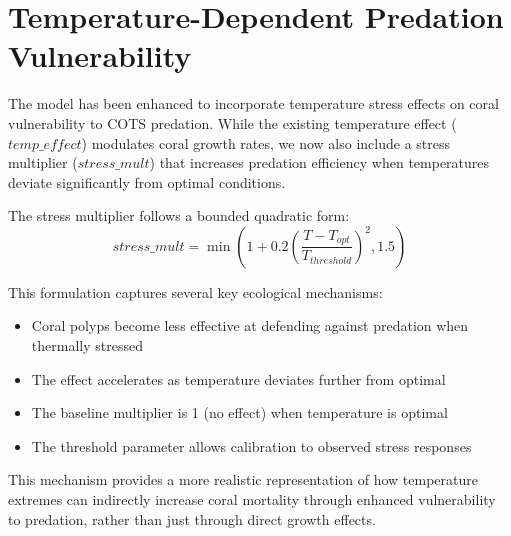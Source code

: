 \section{Temperature-Dependent Predation Vulnerability}

The model has been enhanced to incorporate temperature stress effects on coral vulnerability to COTS predation. While the existing temperature effect ($temp\_effect$) modulates coral growth rates, we now also include a stress multiplier ($stress\_mult$) that increases predation efficiency when temperatures deviate significantly from optimal conditions.

The stress multiplier follows a bounded quadratic form:
\[ stress\_mult = \min(1 + 0.2(\frac{T - T_{opt}}{T_{threshold}})^2, 1.5) \]

This formulation captures several key ecological mechanisms:
\begin{itemize}
    \item Coral polyps become less effective at defending against predation when thermally stressed
    \item The effect accelerates as temperature deviates further from optimal
    \item The baseline multiplier is 1 (no effect) when temperature is optimal
    \item The threshold parameter allows calibration to observed stress responses
\end{itemize}

This mechanism provides a more realistic representation of how temperature extremes can indirectly increase coral mortality through enhanced vulnerability to predation, rather than just through direct growth effects.
